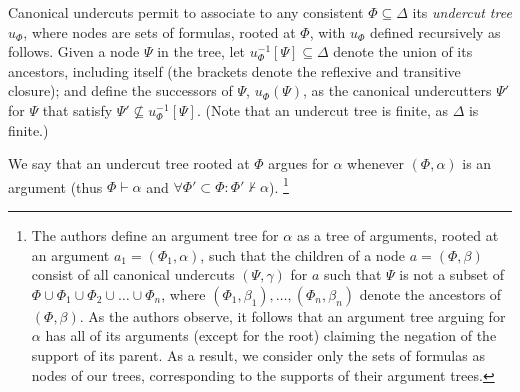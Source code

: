 \documentclass[version=3.21, pagesize, twoside=off, bibliography=totoc, DIV=calc, fontsize=12pt, a4paper, french, english]{scrartcl}
\begin{document}
Canonical undercuts permit to associate to any consistent $\Phi \subseteq \Delta$ its \emph{undercut tree} $u_\Phi$, where nodes are sets of formulas, rooted at $\Phi$, with $u_\Phi$ defined recursively as follows. 
Given a node $\Psi$ in the tree, let $u_\Phi^{-1}[\Psi] \subseteq \Delta$ denote the union of its ancestors, including itself (the brackets denote the reflexive and transitive closure); and define the successors of $\Psi$, $u_\Phi(\Psi)$, as the canonical undercutters $\Psi'$ for $\Psi$ that satisfy $\Psi' \nsubseteq u_\Phi^{-1}[\Psi]$.
(Note that an undercut tree is finite, as $\Delta$ is finite.)

We say that an undercut tree rooted at $\Phi$ argues for $\alpha$ whenever $(\Phi, \alpha)$ is an argument (thus $\Phi ⊢ \alpha$ and $\forall \Phi' \subset \Phi: \Phi' ⊬ \alpha$).
\footnote{The authors define an argument tree for $\alpha$ as a tree of arguments, rooted at an argument $a_1 = (\Phi_1, \alpha)$, such that the children of a node $a = (\Phi, \beta)$ consist of all canonical undercuts $(\Psi, \gamma)$ for $a$ such that $\Psi$ is not a subset of $\Phi \cup \Phi_1 \cup \Phi_2 \cup … \cup \Phi_n$, where $(Φ_1, \beta_1), …, (Φ_n, \beta_n)$ denote the ancestors of $(\Phi, \beta)$.
As the authors observe, it follows that an argument tree arguing for $\alpha$ has all of its arguments (except for the root) claiming the negation of the support of its parent. As a result, we consider only the sets of formulas as nodes of our trees, corresponding to the supports of their argument trees.
}
\end{document}
